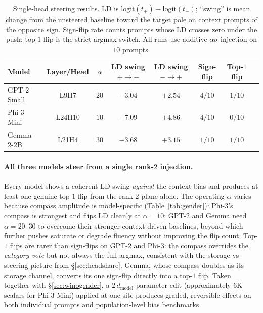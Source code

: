 \begin{table}[h]
\centering
\small
\caption{Single-head steering results. LD is
$\mathrm{logit}(t_{+}) - \mathrm{logit}(t_{-})$; ``swing'' is mean
change from the unsteered baseline toward the target pole on context
prompts of the opposite sign. Sign-flip rate counts prompts whose LD
crosses zero under the push; top-$1$ flip is the strict argmax switch.
All runs use additive $\alpha \sigma$ injection on $10$ prompts.}
\label{tab:steering}
\begin{tabular}{lccccccc}
\toprule
Model & Layer/Head & $\alpha$ & LD swing $+\to -$ & LD swing $-\to +$ &
Sign-flip & Top-$1$ flip \\
\midrule
GPT-2 Small & L9H7   & $20$ & $-3.04$ & $+2.54$ & $4/10$ & $1/10$ \\
Phi-3 Mini  & L24H10 & $10$ & $-7.09$ & $+4.86$ & $4/10$ & $0/10$ \\
Gemma-2-2B  & L21H4  & $30$ & $-3.68$ & $+3.15$ & $1/10$ & $1/10$ \\
\bottomrule
\end{tabular}
\end{table}

\paragraph{All three models steer from a single rank-$2$ injection.}
Every model shows a coherent LD swing \emph{against} the context bias
and produces at least one genuine top-$1$ flip from the rank-$2$ plane
alone. The operating $\alpha$ varies because compass amplitude is
model-specific (Table~\ref{tab:gender}): Phi-3's compass is strongest
and flips LD cleanly at $\alpha = 10$; GPT-2 and Gemma need
$\alpha = 20$--$30$ to overcome their stronger context-driven
baselines, beyond which further pushes saturate or degrade fluency
without improving the flip count. Top-$1$ flips are rarer than
sign-flips on GPT-2 and Phi-3: the compass overrides the
\emph{category vote} but not always the full argmax, consistent with
the storage-vs-steering picture from \S\ref{sec:headshare}. Gemma,
whose compass doubles as its storage channel, converts its one
sign-flip directly into a top-$1$ flip. Taken together with
\S\ref{sec:winogender}, a $2\,d_\text{model}$-parameter edit
(approximately $6\text{K}$ scalars for Phi-3 Mini) applied at one site
produces graded, reversible effects on both individual prompts and
population-level bias benchmarks.
